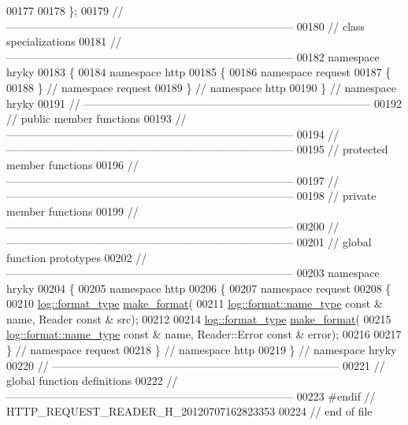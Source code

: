 \begin{DoxyCode}
00177 
00178 \};
00179 \textcolor{comment}{//
      ------------------------------------------------------------------------------}
00180 \textcolor{comment}{// class specializations}
00181 \textcolor{comment}{//
      ------------------------------------------------------------------------------}
00182 \textcolor{keyword}{namespace }hryky
00183 \{
00184 \textcolor{keyword}{namespace }http
00185 \{
00186 \textcolor{keyword}{namespace }request
00187 \{
00188 \} \textcolor{comment}{// namespace request}
00189 \} \textcolor{comment}{// namespace http}
00190 \} \textcolor{comment}{// namespace hryky}
00191 \textcolor{comment}{//
      ------------------------------------------------------------------------------}
00192 \textcolor{comment}{// public member functions}
00193 \textcolor{comment}{//
      ------------------------------------------------------------------------------}
00194 \textcolor{comment}{//
      ------------------------------------------------------------------------------}
00195 \textcolor{comment}{// protected member functions}
00196 \textcolor{comment}{//
      ------------------------------------------------------------------------------}
00197 \textcolor{comment}{//
      ------------------------------------------------------------------------------}
00198 \textcolor{comment}{// private member functions}
00199 \textcolor{comment}{//
      ------------------------------------------------------------------------------}
00200 \textcolor{comment}{//
      ------------------------------------------------------------------------------}
00201 \textcolor{comment}{// global function prototypes}
00202 \textcolor{comment}{//
      ------------------------------------------------------------------------------}
00203 \textcolor{keyword}{namespace }hryky
00204 \{
00205 \textcolor{keyword}{namespace }http
00206 \{
00207 \textcolor{keyword}{namespace }request
00208 \{
00210     \hyperlink{namespacehryky_1_1log_ad50448c3f934f1eacd5c1bcffe8111e1}{log::format_type} \hyperlink{namespacehryky_afd615217f648ff164bc40fb82166d959}{make_format}(
00211         \hyperlink{namespacehryky_1_1log_1_1format_ab7408d1e2ed2d648dbf9bba69eb74288}{log::format::name_type} \textcolor{keyword}{const} & name, Reader \textcolor{keyword}{const} & src);
00212 
00214     \hyperlink{namespacehryky_1_1log_ad50448c3f934f1eacd5c1bcffe8111e1}{log::format_type} \hyperlink{namespacehryky_afd615217f648ff164bc40fb82166d959}{make_format}(
00215         \hyperlink{namespacehryky_1_1log_1_1format_ab7408d1e2ed2d648dbf9bba69eb74288}{log::format::name_type} \textcolor{keyword}{const} & name, Reader::Error \textcolor{keyword}{const} & error);
00216 
00217 \} \textcolor{comment}{// namespace request}
00218 \} \textcolor{comment}{// namespace http}
00219 \} \textcolor{comment}{// namespace hryky}
00220 \textcolor{comment}{//
      ------------------------------------------------------------------------------}
00221 \textcolor{comment}{// global function definitions}
00222 \textcolor{comment}{//
      ------------------------------------------------------------------------------}
00223 \textcolor{preprocessor}{#endif // HTTP\_REQUEST\_READER\_H\_20120707162823353}
00224 \textcolor{preprocessor}{}\textcolor{comment}{// end of file}
\end{DoxyCode}
